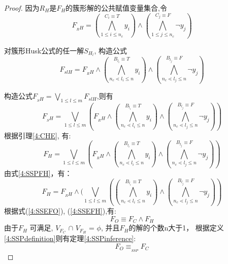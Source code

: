 \begin{proof}
因为${R_H}$是$F_H$的簇形解的公共赋值变量集合,令
\begin{equation}\label{4:SSPRH}
F_{_RH}=
(\bigwedge_{1\leqslant i\leqslant n_c}^{C_i\equiv T} y_i)\wedge
(\bigwedge_{1\leqslant j\leqslant n_c}^{C_j\equiv F}\neg y_j)
\end{equation}

对簇形Husk公式的任一解$S_{H_l}$, 构造公式
\begin{equation}
F_{slH}=F_{_RH}\wedge
(\bigwedge_{n_c\lessdot l_i\leqslant n}^{B_{l_i}\equiv T} y_i)\wedge
(\bigwedge_{n_c\lessdot l_j\leqslant n}^{B_{l_j}\equiv F}\neg y_j)
\end{equation}

构造公式$F_{_SH}=\bigvee_{1\leqslant l\leqslant m}F_{slH}$,则有
\begin{equation}
F_{_SH}=\bigvee_{1\leqslant l\leqslant m}(F_{_RH}\wedge
(\bigwedge_{n_c\lessdot l_i\leqslant n}^{B_{l_i}\equiv T} y_i)\wedge
(\bigwedge_{n_c\lessdot l_j\leqslant n}^{B_{l_j}\equiv F}\neg y_j))
\end{equation}
根据引理\ref{4:CHE}, 有:
\begin{equation}\label{4:SSPFH}
F_H=\bigvee_{1\leqslant l\leqslant m}(F_{_RH}\wedge
(\bigwedge_{n_c\lessdot l_i\leqslant n}^{B_{l_i}\equiv T} y_i)\wedge
(\bigwedge_{n_c\lessdot l_j\leqslant n}^{B_{l_j}\equiv F}\neg y_j))
\end{equation}
由式\ref{4:SSPFH}，有：
\begin{equation}\label{4:SSEFH}
F_H=F_{_RH}\wedge (\bigvee_{1\leqslant l\leqslant m}(
(\bigwedge_{n_c\lessdot l_i\leqslant n}^{B_{l_i}\equiv T} y_i)\wedge
(\bigwedge_{n_c\lessdot l_j\leqslant n}^{B_{l_j}\equiv F}\neg y_j))
\end{equation}
根据式(\ref{4:SSEFO}), (\ref{4:SSEFH}),有:
\begin{equation}\label{4:SSEEND}
F_O\equiv F_C \wedge F_H
\end{equation}
由于$F_H$ 可满足, $V_{F_C}$ $\cap$ $V_{F_H}$ = $\phi$, 并且$F_H$的解的个数n大于1，
根据定义\ref{4:SSPdefinition}则有定理\ref{4:SSPinference}:
\begin{equation}
F_O\equiv_{_{SSP}}  F_C
\end{equation}
\end{proof}

